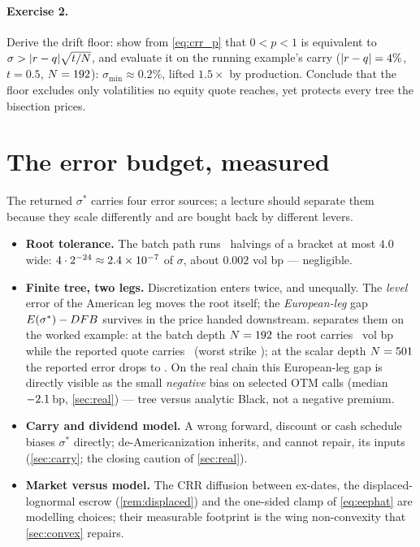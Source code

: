 \documentclass[11pt]{article}
\begin{document}
\paragraph{Exercise 2.}
Derive the drift floor: show from \cref{eq:crr_p} that $0<p<1$ is
equivalent to $\sigma>\lvert r-q\rvert\sqrt{t/N}$, and evaluate it on the running
example's carry ($\lvert r-q\rvert=4\%$, $t=0.5$, $N=192$):
$\sigma_{\min}\approx0.2\%$, lifted $1.5\times$ by production.  Conclude
that the floor excludes only volatilities no equity quote reaches, yet
protects every tree the bisection prices.

\section{The error budget, measured}
\label{sec:budget}

The returned $\sigma^*$ carries four error sources; a lecture should
separate them because they scale differently and are bought back by
different levers.

\begin{itemize}[leftmargin=1.6em,itemsep=1pt]
\item \textbf{Root tolerance.}  The batch path runs \deambisect\ halvings
of a bracket at most $4.0$ wide: $4\cdot2^{-24}\approx
2.4\times10^{-7}$ of $\sigma$, about $0.002$ vol bp --- negligible.
\item \textbf{Finite tree, two legs.}  Discretization enters twice, and
unequally.  The \emph{level} error of the American leg moves the root
itself; the \emph{European-leg} gap $E(\sigma^*)-DFB$ survives in
the price handed downstream.   separates them on the
worked example: at the batch depth $N=192$ the root carries
\deamstrootbp\ vol bp while the reported quote carries \deamstdepthbp\
(worst strike \deamstdepthmax); at the scalar depth
$N=501$ the reported error drops to \deamstdepthbpscalar.
On the real chain this European-leg gap is directly visible as the small
\emph{negative} bias on selected OTM calls (median
$-2.1$\,bp, \cref{sec:real}) --- tree versus analytic
Black, not a negative premium.
\item \textbf{Carry and dividend model.}  A wrong forward, discount or
cash schedule biases $\sigma^*$ directly; de-Americanization inherits, and
cannot repair, its inputs (\cref{sec:carry}; the closing caution of
\cref{sec:real}).
\item \textbf{Market versus model.}  The CRR diffusion between ex-dates,
the displaced-lognormal escrow (\cref{rem:displaced}) and the one-sided
clamp of \cref{eq:eephat} are modelling choices; their measurable
footprint is the wing non-convexity that \cref{sec:convex} repairs.
\end{itemize}
\end{document}
